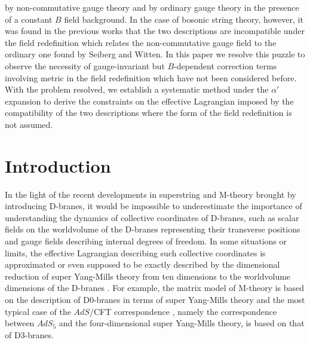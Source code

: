 \documentclass[a4paper,12pt]{article}
\begin{document}
by non-commutative gauge theory
and by ordinary gauge theory
in the presence of a constant $B$ field background.
In the case of bosonic string theory, however,
it was found in the previous works that
the two descriptions are incompatible
under the field redefinition
which relates the non-commutative gauge field 
to the ordinary one found by Seiberg and Witten.
In this paper we resolve
this puzzle to observe the necessity
of gauge-invariant but $B$-dependent correction terms
involving metric in the field redefinition
which have not been considered before.
With the problem resolved, we establish
a systematic method under the $\alpha'$ expansion to derive
the constraints on the effective Lagrangian
imposed by the compatibility of the two descriptions
where the form of the field redefinition is not assumed.

\newpage
\section{Introduction}
\setcounter{equation}{0}
\indent

In the light of the recent developments in superstring and M-theory
brought by introducing D-branes,
it would be impossible to underestimate
the importance of understanding
the dynamics of collective coordinates of D-branes,
such as scalar fields on the worldvolume of the D-branes
representing their transverse positions and
gauge fields describing internal degrees of freedom.
In some situations or limits,
the effective Lagrangian describing such collective coordinates
is approximated or even supposed to be exactly described by
the dimensional reduction of super Yang-Mills theory from
ten dimensions to the worldvolume dimensions
of the D-branes \cite{bound-states, DKPS}.
For example, the matrix model of M-theory \cite{BFSS}
is based on the description of D0-branes in terms of
super Yang-Mills theory
and the most typical case
of the $AdS$/CFT correspondence \cite{Maldacena},
namely the correspondence between
$AdS_5$ and the four-dimensional super Yang-Mills theory,
is based on that of D3-branes.
\end{document}
